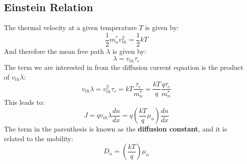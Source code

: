 \subsection{Einstein Relation}
The thermal velocity at a given temperature $T$ is given by:
    \begin{equation}
        {\frac{1}{2}}m_n^*v_{th}^2 = {\frac{1}{2}}kT
    \end{equation}
And therefore the mean free path $\lambda$ is given by:
    \begin{equation}
        \lambda  = {v_{th}}{\tau _c}
    \end{equation}
The term we are interested in from the diffusion current equation is the product of $v_{th} \lambda$:
    \begin{equation}
        {v_{th}}\lambda  = v_{th}^2{\tau _c} = kT\frac{{{\tau _c}}}{{m_n^*}} = \frac{{kT}}{q}\frac{{q{\tau _c}}}{{m_n^*}}
    \end{equation}
This leads to:
    \begin{equation}
        J = q{v_{th}}\lambda \frac{{dn}}{{dx}} = q\left( {\frac{{kT}}{q}{\mu _n}} \right)\frac{{dn}}{{dx}}
    \end{equation}
The term in the parenthesis is known as the \textbf{diffusion constant}, and it is related to the mobility: 
    \begin{equation}
        {D_n} = \left( {\frac{{kT}}{q}} \right){\mu _n}
    \end{equation}
